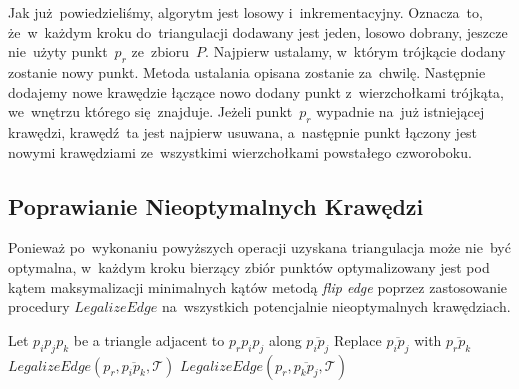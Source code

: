 \documentclass[skorowidz,autorrok,backref,xodstep,oswiadczenie]{wmimgr}
\begin{document}
Jak już~powiedzieliśmy, algorytm jest losowy i~inkrementacyjny. Oznacza~to, że~w~każdym kroku do~triangulacji dodawany jest jeden, losowo dobrany, jeszcze nie~użyty punkt~$p_{r}$ ze~zbioru~$P$. Najpierw ustalamy, w~którym trójkącie dodany zostanie nowy punkt. Metoda ustalania opisana zostanie za~chwilę. Następnie dodajemy nowe krawędzie łączące nowo dodany punkt z~wierzchołkami trójkąta, we~wnętrzu którego się~znajduje. Jeżeli punkt~$p_{r}$ wypadnie na~już istniejącej krawędzi, krawędź~ta jest najpierw usuwana, a~następnie punkt łączony jest nowymi krawędziami ze~wszystkimi wierzchołkami powstałego czworoboku.

\subsection{Poprawianie Nieoptymalnych Krawędzi}

Ponieważ po~wykonaniu powyższych operacji uzyskana triangulacja może nie~być optymalna, w~każdym kroku bierzący zbiór punktów optymalizowany jest pod kątem maksymalizacji minimalnych kątów metodą \emph{flip edge} poprzez zastosowanie procedury $LegalizeEdge$ na~wszystkich potencjalnie nieoptymalnych krawędziach.

\begin{algorithm}
\caption{$LegalizeEdge(p_{r}, \overline{p_{i} p_{j}}, \mathcal{T})$ \cite{geometria}}
\label{LegalizeEdge}
\begin{algorithmic}
        \STATE Let $p_{i} p_{j} p_{k}$ be a triangle adjacent to $p_{r} p_{i} p_{j}$ along $\overline{p_{i} p_{j}}$
        \STATE Replace $\overline{p_{i} p_{j}}$ with $\overline{p_{r} p_{k}}$
        \STATE $LegalizeEdge(p_{r}, \overline{p_{i} p_{k}}, \mathcal{T})$
        \STATE $LegalizeEdge(p_{r}, \overline{p_{k} p_{j}}, \mathcal{T})$
    \ENDIF
\end{algorithmic}
\end{algorithm}
\end{document}
